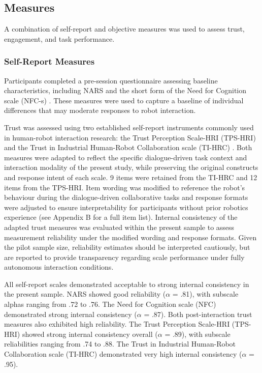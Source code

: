 \documentclass[
  authoryear,
  doubleblind,
  3p]{elsarticle}
\begin{document}
\subsection{Measures}\label{measures}

A combination of self-report and objective measures was used to assess
trust, engagement, and task performance.

\subsubsection{Self-Report Measures}\label{self-report-measures}

Participants completed a pre-session questionnaire assessing baseline
characteristics, including NARS and the short form of the Need for
Cognition scale (NFC-s) \citep{cacioppo1982, nomura}. These measures
were used to capture a baseline of individual differences that may
moderate responses to robot interaction.

Trust was assessed using two established self-report instruments
commonly used in human-robot interaction research: the Trust Perception
Scale-HRI (TPS-HRI) and the Trust in Industrial Human-Robot
Collaboration scale (TI-HRC) \citep{schaefer2016, charalambous2016}.
Both measures were adapted to reflect the specific dialogue-driven task
context and interaction modality of the present study, while preserving
the original constructs and response intent of each scale. 9 items were
retained from the TI-HRC and 12 items from the TPS-HRI. Item wording was
modified to reference the robot's behaviour during the dialogue-driven
collaborative tasks and response formats were adjusted to ensure
interpretability for participants without prior robotics experience (see
Appendix B for a full item list). Internal consistency of the adapted
trust measures was evaluated within the present sample to assess
measurement reliability under the modified wording and response formats.
Given the pilot sample size, reliability estimates should be interpreted
cautiously, but are reported to provide transparency regarding scale
performance under fully autonomous interaction conditions.

All self-report scales demonstrated acceptable to strong internal
consistency in the present sample. NARS showed good reliability
(\(\alpha\) = .81), with subscale alphas ranging from .72 to .76. The
Need for Cognition scale (NFC) demonstrated strong internal consistency
(\(\alpha\) = .87). Both post-interaction trust measures also exhibited
high reliability. The Trust Perception Scale-HRI (TPS-HRI) showed strong
internal consistency overall (\(\alpha\) = .89), with subscale
reliabilities ranging from .74 to .88. The Trust in Industrial
Human-Robot Collaboration scale (TI-HRC) demonstrated very high internal
consistency (\(\alpha\) = .95).
\end{document}
